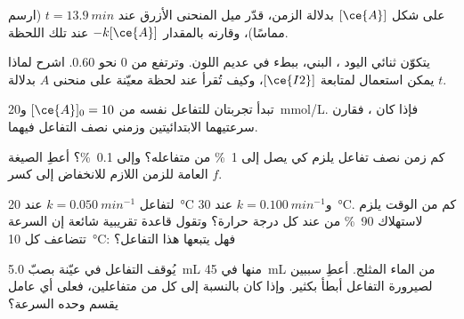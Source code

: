 \begin{exercise}[$\star\star$]\label{exo:g12:reaction-rates:9}
على شكل $[\ce{A}]$ بدلالة الزمن، قدّر ميل المنحنى
الأزرق عند $t = \qty{13.9}{min}$ (ارسم مماسًا)، وقارنه
بالمقدار $-k[\ce{A}]$ عند تلك اللحظة.
\end{exercise}

\begin{exercise}[$\star\star$]\label{exo:g12:reaction-rates:10}
يتكوّن ثنائي اليود ، البني، ببطء في  عديم اللون. وترتفع
 من 0 نحو 0.60. اشرح لماذا يمكن استعمال 
لمتابعة $[\ce{I2}]$، وكيف تُقرأ  عند لحظة
معيّنة على منحنى $A$ بدلالة $t$.
\end{exercise}

\begin{exercise}[$\star\star$]\label{exo:g12:reaction-rates:11}
تبدأ تجربتان للتفاعل نفسه من $[\ce{A}]_0 = 10$
و\qty{20}{mmol/L}. فإذا كان ، فقارن سرعتيهما
الابتدائيتين وزمني نصف التفاعل فيهما.
\end{exercise}

\begin{exercise}[$\star\star\star$]\label{exo:g12:reaction-rates:12}
كم زمن نصف تفاعل يلزم  كي يصل
إلى \qty{1}{\percent} من متفاعله؟ وإلى \qty{0.1}{\percent}؟ أعطِ الصيغة
العامة للزمن اللازم للانخفاض إلى كسر $f$.
\end{exercise}

\begin{exercise}[$\star\star\star$]\label{exo:g12:reaction-rates:13}
لتفاعل $k = \qty{0.050}{min^{-1}}$ عند \qty{20}{\celsius}
و$k = \qty{0.100}{min^{-1}}$ عند \qty{30}{\celsius}. كم من الوقت يلزم
لاستهلاك \qty{90}{\percent} من  عند كل درجة حرارة؟ وتقول
قاعدة تقريبية شائعة إن السرعة تتضاعف كل \qty{10}{\celsius}: فهل
يتبعها هذا التفاعل؟
\end{exercise}

\begin{exercise}[$\star\star\star$]\label{exo:g12:reaction-rates:14}
يُوقف التفاعل في عيّنة بصبّ \qty{5.0}{mL} منها في \qty{45}{mL} من الماء
المثلج. أعطِ سببين لصيرورة التفاعل أبطأ بكثير. وإذا كان
 بالنسبة إلى كل من متفاعلين، فعلى أي عامل
يقسم  وحده السرعة؟
\end{exercise}

